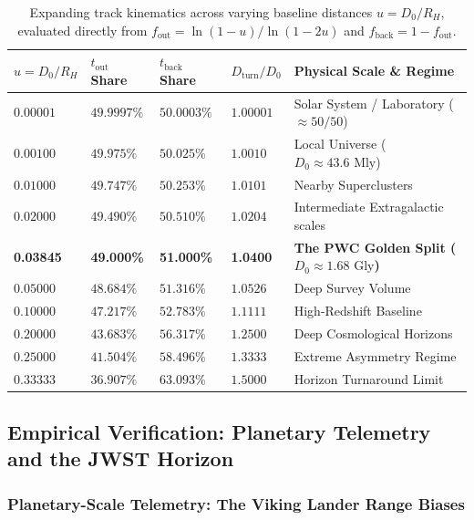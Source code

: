 \documentclass[11pt,a4paper]{article}
\begin{document}
\begin{table}[!htbp]
\centering
\caption{Expanding track kinematics across varying baseline distances $u = D_0 / R_H$, evaluated directly from $f_{\text{out}} = \ln(1 - u)/\ln(1 - 2u)$ and $f_{\text{back}} = 1 - f_{\text{out}}$.}
\label{tab:expanding_track_kinematics}
\small
\setlength{\tabcolsep}{5pt}
\renewcommand{\arraystretch}{1.15}
\begin{tabularx}{\textwidth}{C{2.1cm} C{2.2cm} C{2.2cm} C{2.1cm} Y}
\toprule
$u = D_0 / R_H$ & $t_{\text{out}}$ Share & $t_{\text{back}}$ Share & $D_{\text{turn}} / D_0$ & Physical Scale \& Regime \\
\midrule
$0.00001$ & $49.9997\%$ & $50.0003\%$ & $1.00001$ & Solar System / Laboratory ($\approx 50/50$) \\
$0.00100$ & $49.975\%$ & $50.025\%$ & $1.0010$ & Local Universe ($D_0 \approx 43.6\text{ Mly}$) \\
$0.01000$ & $49.747\%$ & $50.253\%$ & $1.0101$ & Nearby Superclusters \\
$0.02000$ & $49.490\%$ & $50.510\%$ & $1.0204$ & Intermediate Extragalactic scales \\
\textbf{0.03845} & \textbf{49.000\%} & \textbf{51.000\%} & \textbf{1.0400} & \textbf{The PWC Golden Split ($D_0 \approx 1.68\text{ Gly}$)} \\
$0.05000$ & $48.684\%$ & $51.316\%$ & $1.0526$ & Deep Survey Volume \\
$0.10000$ & $47.217\%$ & $52.783\%$ & $1.1111$ & High-Redshift Baseline \\
$0.20000$ & $43.683\%$ & $56.317\%$ & $1.2500$ & Deep Cosmological Horizons \\
$0.25000$ & $41.504\%$ & $58.496\%$ & $1.3333$ & Extreme Asymmetry Regime \\
$0.33333$ & $36.907\%$ & $63.093\%$ & $1.5000$ & Horizon Turnaround Limit \\
\bottomrule
\end{tabularx}
\end{table}

\subsection{Empirical Verification: Planetary Telemetry and the JWST Horizon}
\label{subsec:empirical_telemetry_jwst}

\subsubsection{Planetary-Scale Telemetry: The Viking Lander Range Biases}
\end{document}
